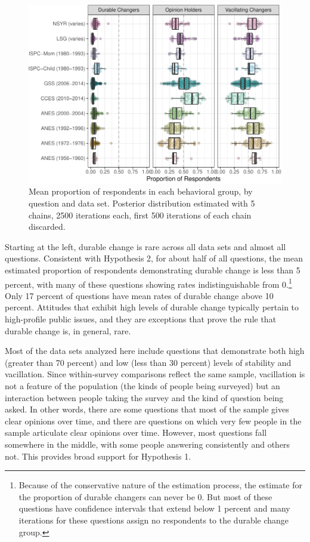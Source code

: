 \documentclass[12pt,]{article}
\begin{document}
\begin{figure}
\centering
\includegraphics{ambivalence_everywhere_files/figure-latex/patterncomp-1.pdf}
\caption{\label{fig:patterncomp}Mean proportion of respondents in each behavioral group, by question and data set. Posterior distribution estimated with 5 chains, 2500 iterations each, first 500 iterations of each chain discarded.}
\end{figure}

Starting at the left, durable change is rare across all data sets and almost all questions. Consistent with Hypothesis 2, for about half of all questions, the mean estimated proportion of respondents demonstrating durable change is less than 5 percent, with many of these questions showing rates indistinguishable from 0.\footnote{Because of the conservative nature of the estimation process, the estimate for the proportion of durable changers can never be 0. But most of these questions have confidence intervals that extend below 1 percent and many iterations for these questions assign no respondents to the durable change group.} Only 17 percent of questions have mean rates of durable change above 10 percent. Attitudes that exhibit high levels of durable change typically pertain to high-profile public issues, and they are exceptions that prove the rule that durable change is, in general, rare.

Most of the data sets analyzed here include questions that demonstrate both high (greater than 70 percent) and low (less than 30 percent) levels of stability and vacillation. Since within-survey comparisons reflect the same sample, vacillation is not a feature of the population (the kinds of people being surveyed) but an interaction between people taking the survey and the kind of question being asked. In other words, there are some questions that most of the sample gives clear opinions over time, and there are questions on which very few people in the sample articulate clear opinions over time. However, most questions fall somewhere in the middle, with some people answering consistently and others not. This provides broad support for Hypothesis 1.
\end{document}
